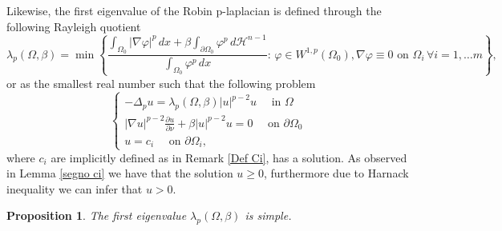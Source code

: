 \documentclass[12pt]{article}
\newcommand{\abs}[1]{{\left|#1\right|}}
\newcommand{\dH}{d\mathcal{H}^{n-1}}
\theoremstyle{definition}
\theoremstyle{plain}
\newtheorem{prop}[teorema]{Proposition}
\theoremstyle{definition}
\begin{document}
Likewise, the first eigenvalue of the Robin p-laplacian is defined through the following Rayleigh quotient
\begin{equation*}
    \lambda_p(\Omega,\beta)=\min\left\{\frac{\int_{\Omega_0}\abs{\nabla\varphi}^p\,dx+\beta\int_{\partial\Omega_0}\varphi^p\,\dH}{\int_{\Omega_0}\varphi^p\,dx}:\, \varphi \in W^{1,p}(\Omega_0), \nabla\varphi\equiv0 \text{ on }  \Omega_i \, \forall i=1, \dots m\right\},
\end{equation*}
or as the smallest real number such that the following problem
\begin{equation}\label{eig}
        \begin{cases}
            -\Delta_pu=\lambda_{p}(\Omega,\beta)\abs{u}^{p-2}u\quad\text{ in }\Omega \\
            \abs{\nabla u}^{p-2}\frac{\partial u}{\partial\nu}+\beta \abs{u}^{p-2}u=0\quad\text{ on }\partial\Omega_0\\
            u=c_i \quad\text{ on }\partial\Omega_i,
        \end{cases}
    \end{equation}
where $c_i$ are implicitly defined as in Remark \ref{Def Ci}, has a solution. As observed in Lemma \ref{segno ci} we have that the solution $u\geq0$, furthermore due to Harnack inequality we can infer that $u>0$.
\begin{prop}
    The first eigenvalue $\lambda_{p}(\Omega,\beta)$ is simple.
\end{prop}
\end{document}
